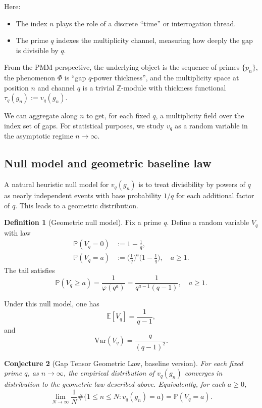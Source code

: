 \documentclass[11pt]{article}
\theoremstyle{definition}
\newtheorem{definition}{Definition}[section]
\theoremstyle{plain}
\newtheorem{conjecture}[definition]{Conjecture}
\theoremstyle{remark}
\newcommand{\ZZ}{\mathbb{Z}}
\newcommand{\EE}{\mathbb{E}}
\newcommand{\Var}{\mathrm{Var}}
\newcommand{\Prob}{\mathbb{P}}
\newcommand{\vq}{v_q}
\newcommand{\1}{\mathbb{1}}
\begin{document}
Here:

\begin{itemize}[leftmargin=*]
  \item The index \(n\) plays the role of a discrete ``time'' or interrogation thread.
  \item The prime \(q\) indexes the multiplicity channel, measuring how deeply the gap is divisible by \(q\).
\end{itemize}

From the PMM perspective, the underlying object is the sequence of primes \(\{p_n\}\), the phenomenon \(\Phi\) is ``gap \(q\)-power thickness'', and the multiplicity space at position \(n\) and channel \(q\) is a trivial \(\ZZ\)-module with thickness functional \(\tau_{q}(g_n) := v_q(g_n)\).

We can aggregate along \(n\) to get, for each fixed \(q\), a multiplicity field over the index set of gaps. For statistical purposes, we study \(v_q\) as a random variable in the asymptotic regime \(n\to\infty\).

\subsection{Null model and geometric baseline law}

A natural heuristic null model for \(\vq(g_n)\) is to treat divisibility by powers of \(q\) as nearly independent events with base probability \(1/q\) for each additional factor of \(q\). This leads to a geometric distribution.

\begin{definition}[Geometric null model]
Fix a prime \(q\). Define a random variable \(V_q\) with law
\begin{align*}
  \Prob(V_q = 0) &:= 1-\frac{1}{q},\\
  \Prob(V_q = a) &:= \bigg(\frac{1}{q}\bigg)^a\bigg(1-\frac{1}{q}\bigg),\quad a\ge 1.
\end{align*}
The tail satisfies
\[
  \Prob(V_q \ge a) = \frac{1}{\varphi(q^a)} = \frac{1}{q^{a-1}(q-1)},\quad a\ge 1.
\]
\end{definition}

Under this null model, one has
\[
  \EE[V_q] = \frac{1}{q-1},
\]
and
\[
  \Var(V_q) = \frac{q}{(q-1)^2}.
\]

\begin{conjecture}[Gap Tensor Geometric Law, baseline version]
For each fixed prime \(q\), as \(n\to\infty\), the empirical distribution of \(\vq(g_n)\) converges in distribution to the geometric law described above. Equivalently, for each \(a\ge 0\),
\[
  \lim_{N\to\infty} \frac{1}{N}\#\{1\le n\le N : \vq(g_n)=a\} = \Prob(V_q=a).
\]
\end{conjecture}
\end{document}
